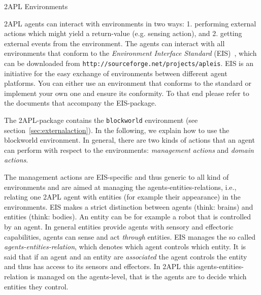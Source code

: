 
\begin{chapter}{2APL Environments}
\label{chap:environment}

2APL agents can interact with environments in two ways: 
1. performing external actions which might yield a return-value (e.g. sensing action),
and 2. getting external events from the environment. 
The agents can interact with all environments that conform to the
\emph{Environment Interface Standard} (EIS)~\cite{ifi0910behrens}, which can be downloaded from 
\texttt{http://sourceforge.net/projects/apleis}. 
EIS is an initiative for the easy exchange of environments between different
agent platforms.
You can either use an environment that conforms to the standard or implement your own one and
ensure its conformity. To that end please refer to the documents that accompany the EIS-package.


The 2APL-package contains the \texttt{blockworld} environment 
(see section~\ref{sec:externalaction}).
In the following, we explain
how to use the blockworld environment. In general, there are two kinds of
actions that an agent can perform with respect to the
environments: \emph{management actions} and \emph{domain actions}.


    The management actions are EIS-specific and thus generic to all kind of environments and are aimed
    at managing the agents-entities-relations, i.e., relating one 2APL agent with
    entities (for example their appearance) in the environments. 
    EIS makes a strict distinction between agents (think: brains) and entities (think: bodies). 
    An entity can be for example a robot that is controlled by an agent. 
    In general entities provide agents with sensory and effectoric capabilities, agents can 
    sense and act \emph{through} entities.
    EIS manages the
    so called \emph{agents-entities-relation}, which denotes which agent controls which
    entity. It is said that if an agent and an entity are \emph{associated} the agent controls the
    entity and thus has access to its sensors and effectors.
    In 2APL this agents-entities-relation is managed on the agents-level, that is the agents
    are to decide which entities they control.
    

\end{chapter}
